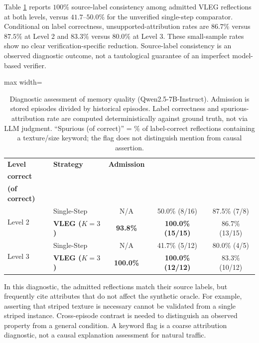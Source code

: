 \documentclass[journal]{IEEEtran}
\theoremstyle{definition}
\theoremstyle{remark}
\begin{document}
Table \ref{tab:exp5_memory_quality} reports $100\%$ source-label consistency among admitted VLEG reflections at both levels, versus $41.7$--$50.0\%$ for the unverified single-step comparator. Conditional on label correctness, unsupported-attribution rates are $86.7\%$ versus $87.5\%$ at Level 2 and $83.3\%$ versus $80.0\%$ at Level 3. These small-sample rates show no clear verification-specific reduction. Source-label consistency is an observed diagnostic outcome, not a tautological guarantee of an imperfect model-based verifier.

\begin{table}[!t]
    \centering
    \caption{Diagnostic assessment of memory quality (Qwen2.5-7B-Instruct). Admission is stored episodes divided by historical episodes. Label correctness and spurious-attribution rate are computed deterministically against ground truth, not via LLM judgment. ``Spurious (of correct)'' = \% of label-correct reflections containing a texture/size keyword; the flag does not distinguish mention from causal assertion.}
    \label{tab:exp5_memory_quality}
    \footnotesize
    \setlength{\tabcolsep}{3pt}
    \begin{adjustbox}{max width=\linewidth}
    \begin{tabular}{@{}llccc@{}}
        \toprule
        \textbf{Level} & \textbf{Strategy} & \textbf{Admission} & \shortstack{\textbf{Label-}\\\textbf{correct}} & \shortstack{\textbf{Spurious}\\\textbf{(of correct)}} \\
        \midrule
        \multirow{2}{*}{Level 2} & Single-Step & N/A & 50.0\% (8/16) & 87.5\% (7/8) \\
                                 & \textbf{VLEG ($K{=}3$)} & \textbf{93.8\%} & \textbf{100.0\% (15/15)} & 86.7\% (13/15) \\
        \midrule
        \multirow{2}{*}{Level 3} & Single-Step & N/A & 41.7\% (5/12) & 80.0\% (4/5) \\
                                 & \textbf{VLEG ($K{=}3$)} & \textbf{100.0\%} & \textbf{100.0\% (12/12)} & 83.3\% (10/12) \\
        \bottomrule
    \end{tabular}
    \end{adjustbox}
\end{table}

In this diagnostic, the admitted reflections match their source labels, but frequently cite attributes that do not affect the synthetic oracle. For example, asserting that striped texture is necessary cannot be validated from a single striped instance. Cross-episode contrast is needed to distinguish an observed property from a general condition. A keyword flag is a coarse attribution diagnostic, not a causal explanation assessment for natural traffic.
\end{document}
